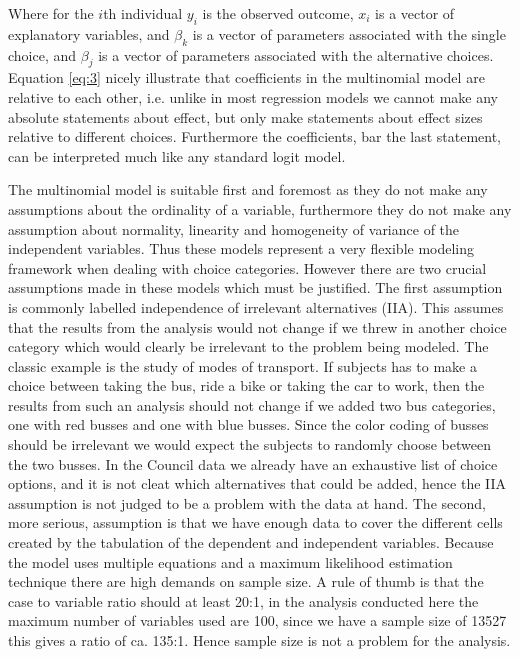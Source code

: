 Where for the $i$th individual $y_i$ is the observed outcome, $x_i$ is a vector of explanatory variables, and $\beta_k$ is a vector of parameters associated with the single choice, and $\beta_j$ is a vector of parameters associated with the alternative choices. Equation \ref{eq:3} nicely illustrate that coefficients in the multinomial model are relative to each other, i.e. unlike in most regression models we cannot make any absolute statements about effect, but only make statements about effect sizes relative to different choices. Furthermore the coefficients, bar the last statement, can be interpreted much like any standard logit model. 


The multinomial model is suitable first and foremost as they do not make any assumptions about the ordinality of a variable, furthermore they do not make any assumption about normality, linearity and homogeneity of variance of the independent variables. Thus these models represent a very flexible modeling framework when dealing with choice categories. However there are two crucial assumptions made in these models which must be justified. The first assumption is commonly labelled independence of irrelevant alternatives (IIA). This assumes that the results from the analysis would not change if we threw in another choice category which would clearly be irrelevant to the problem being modeled. The classic example is the study of modes of transport. If subjects has to make a choice between taking the bus, ride a bike or taking the car to work, then the results from such an analysis should not change if we added two bus categories, one with red busses and one with blue busses. Since the color coding of busses should be irrelevant we would expect the subjects to randomly choose between the two busses. In the Council data we already have an exhaustive list of choice options, and it is not cleat which alternatives that could be added, hence the IIA assumption is not judged to be a problem with the data at hand. The second, more serious, assumption is that we have enough data to cover the different cells created by the tabulation of the dependent and independent variables. Because the model uses multiple equations and a maximum likelihood estimation technique there are high demands on sample size. A rule of thumb is that the case to variable ratio should at least 20:1, in the analysis conducted here the maximum number of variables used are 100, since we have a sample size of 13527 this gives a ratio of ca. 135:1. Hence sample size is not a problem for the analysis. 

